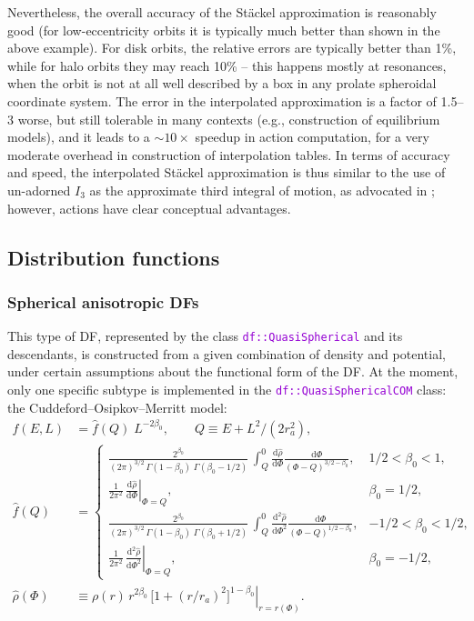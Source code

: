 \documentclass[12pt]{article}
\newcommand{\ttt}[1]{\textcolor{darkviolet}{\texttt{#1}}}
\renewcommand{\d}{\mathrm{d}}
\begin{document}
Nevertheless, the overall accuracy of the St\"ackel approximation is reasonably good (for low-eccentricity orbits it is typically much better than shown in the above example). For disk orbits, the relative errors are typically better than 1\%, while for halo orbits they may reach 10\% -- this happens mostly at resonances, when the orbit is not at all well described by a box in any prolate spheroidal coordinate system. The error in the interpolated approximation is a factor of 1.5--3 worse, but still tolerable in many contexts (e.g., construction of equilibrium models), and it leads to a $\sim 10\times$ speedup in action computation, for a very moderate overhead in construction of interpolation tables. In terms of accuracy and speed, the interpolated St\"ackel approximation is thus similar to the use of un-adorned $I_3$ as the approximate third integral of motion, as advocated in \cite{Bienayme2015}; however, actions have clear conceptual advantages.


\subsection{Distribution functions}  \label{sec:DFdetails}

\subsubsection{Spherical anisotropic DFs}  \label{sec:DFsphericalDetails}

This type of DF, represented by the class \ttt{df::QuasiSpherical} and its descendants, is constructed from a given combination of density and potential, under certain assumptions about the functional form of the DF. At the moment, only one specific subtype is implemented in the \ttt{df::QuasiSphericalCOM} class: the Cuddeford--Osipkov--Merritt model:
\begin{align}  \label{eq:DFanisotropic}
f(E,L) &= \hat f(Q) \; L^{-2\beta_0}, \qquad Q\equiv E + L^2 / (2 r_a^2) , \\[3mm]
\hat f(Q) &= \left\{  \begin{array}{ll}
\displaystyle \frac{2^{\beta_0}}{(2\pi)^{3/2}\, \Gamma(1-\beta_0)\; \Gamma(\beta_0-1/2)}\,
\int_Q^0 \frac{\d \hat\rho}{\d \Phi} \frac{\d \Phi}{(\Phi - Q)^{3/2-\beta_0}}, &
1/2<\beta_0<1, \\[7mm]
\displaystyle \frac{1}{2\pi^2}\, 
\left. \frac{\d \hat\rho}{\d \Phi} \right|_{\Phi=Q}, &
\beta_0=1/2, \\[7mm]
\displaystyle \frac{2^{\beta_0}}{(2\pi)^{3/2}\, \Gamma(1-\beta_0)\; \Gamma(\beta_0+1/2)}\,
\int_Q^0 \frac{\d ^2\hat\rho}{\d \Phi^2} \frac{\d \Phi}{(\Phi - Q)^{1/2-\beta_0}}, &
-1/2<\beta_0<1/2, \\[7mm]
\displaystyle \frac{1}{2\pi^2}\, 
\left. \frac{\d ^2\hat\rho}{\d \Phi^2} \right|_{\Phi=Q} , &
\beta_0=-1/2,
\end{array} \right. \nonumber \\[3mm]
\hat\rho(\Phi) &\equiv \left. \rho(r) \,r^{2\beta_0}\, \big[1 + (r/r_a)^2\big]^{1-\beta_0} \right|_{r=r(\Phi)}.  \nonumber
\end{align}
\end{document}
